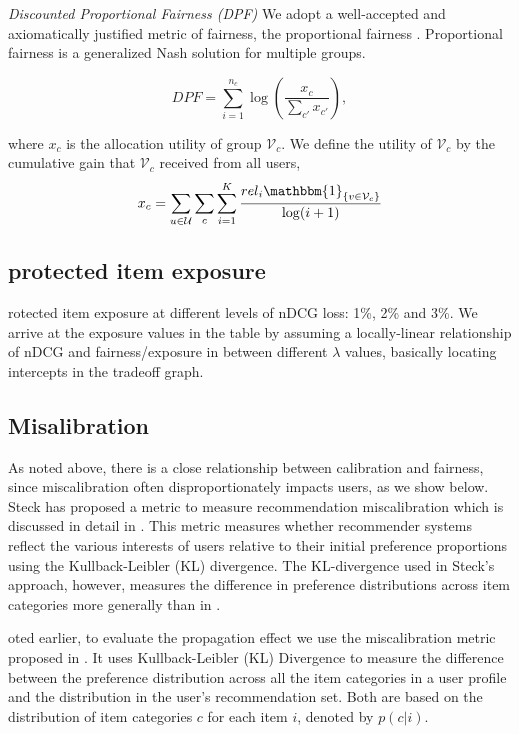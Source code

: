         
        \textit{Discounted Proportional Fairness (DPF)}
        We adopt a well-accepted and axiomatically justified metric of fairness, the proportional fairness \cite{kelly1998rate}. Proportional fairness is a generalized Nash solution for multiple groups.
        
        \begin{equation*}
            DPF=\sum_{i=1}^{n_c}\log\left(\frac{x_c}{\sum_{c'}x_{c'}}\right),
        \end{equation*}
        
        where $x_c$ is the allocation utility of group $\mathcal V_c$. We define the utility of $\mathcal V_c$ by the cumulative gain that $\mathcal V_c$ received from all users,
        \begin{equation*}
        x_c=\sum_{u\in\mathcal U}\sum_{c}\sum_{i=1}^K\frac{{rel}_i\mathbbm{1}_{\{v\in \mathcal V_{c}\}}}{\log(i+1)}
        \end{equation*}

    \subsection{protected item exposure}
    rotected item exposure at different levels of nDCG loss: 1\%, 2\% and 3\%. We arrive at the exposure values in the table by assuming a locally-linear relationship of nDCG and fairness/exposure in between different $\lambda$ values, basically locating intercepts in the tradeoff graph.
    
    \subsection{Misalibration}
    As noted above, there is a close relationship between calibration and fairness, since miscalibration often disproportionately impacts users, as we show below. 
    Steck \cite{steck2018calibrated} has proposed a metric to measure recommendation miscalibration which is discussed in detail in . This metric measures whether recommender systems reflect the various interests of users relative to their initial preference proportions using the Kullback-Leibler (KL) divergence.
    The KL-divergence used in Steck's approach, however, measures the difference in preference distributions across item categories more generally than in \cite{tsintzou2018bias}.
    
    oted earlier, to evaluate the propagation effect we use the miscalibration metric proposed in \cite{steck2018calibrated}. It uses Kullback-Leibler (KL) Divergence to measure the difference between the preference distribution across all the item categories in a user profile and the distribution in the user's recommendation set. Both are based on the distribution of item categories $c$ for each item $i$, denoted by $p(c|i)$.
    
